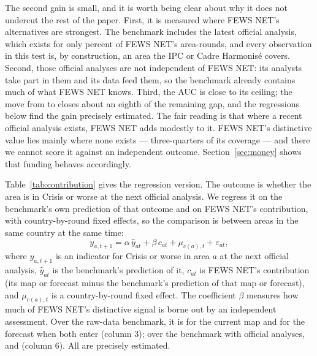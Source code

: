 \documentclass[11pt]{article}
\begin{document}
The second gain is small, and it is worth being clear about why it does not undercut the rest of the paper. First, it is measured where FEWS NET's alternatives are strongest. The benchmark includes the latest official analysis, which exists for only \shareWithIndependent{} percent of FEWS NET's area-rounds, and every observation in this test is, by construction, an area the IPC or Cadre Harmonis\'e covers. Second, those official analyses are not independent of FEWS NET: its analysts take part in them and its data feed them, so the benchmark already contains much of what FEWS NET knows. Third, the AUC is close to its ceiling; the move from \aucRawIPC{} to \aucRawIPCFews{} closes about an eighth of the remaining gap, and the regressions below find the gain precisely estimated. The fair reading is that where a recent official analysis exists, FEWS NET adds modestly to it. FEWS NET's distinctive value lies mainly where none exists --- three-quarters of its coverage --- and there we cannot score it against an independent outcome. Section~\ref{sec:money} shows that funding behaves accordingly.

Table~\ref{tab:contribution} gives the regression version. The outcome is whether the area is in Crisis or worse at the next official analysis. We regress it on the benchmark's own prediction of that outcome and on FEWS NET's contribution, with country-by-round fixed effects, so the comparison is between areas in the same country at the same time:
\begin{equation*}
y_{a,t+1} = \alpha\, \hat{y}_{at} + \beta\, c_{at} + \mu_{c(a),t} + \varepsilon_{at},
\end{equation*}
where $y_{a,t+1}$ is an indicator for Crisis or worse in area $a$ at the next official analysis, $\hat{y}_{at}$ is the benchmark's prediction of it, $c_{at}$ is FEWS NET's contribution (its map or forecast minus the benchmark's prediction of that map or forecast), and $\mu_{c(a),t}$ is a country-by-round fixed effect. The coefficient $\beta$ measures how much of FEWS NET's distinctive signal is borne out by an independent assessment. Over the raw-data benchmark, it is \contribRawCur{} for the current map and \contribRawFc{} for the forecast when both enter (column 3); over the benchmark with official analyses, \contribRawIPCCur{} and \contribRawIPCFc{} (column 6). All are precisely estimated.
\end{document}
